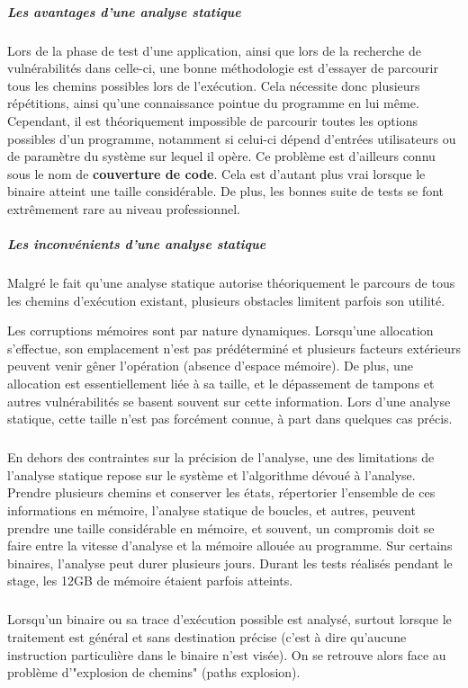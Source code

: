 \subparagraph{Les avantages d'une analyse statique}

Lors de la phase de test d'une application, ainsi que lors de la recherche de vulnérabilités dans celle-ci, une bonne méthodologie
est d'essayer de parcourir tous les chemins possibles lors de l'exécution. Cela nécessite donc plusieurs répétitions, ainsi qu'une connaissance
pointue du programme en lui même.\newline
Cependant, il est théoriquement impossible de parcourir toutes les options possibles d'un programme, notamment si
celui-ci dépend d'entrées utilisateurs ou de paramètre du système sur lequel il opère. Ce problème est d'ailleurs connu sous le nom de \textbf{couverture de code}. Cela est d'autant plus vrai lorsque le binaire atteint une taille
considérable. De plus, les bonnes suite de tests se font extrêmement rare au niveau professionnel.

\subparagraph{Les inconvénients d'une analyse statique}

Malgré le fait qu'une analyse statique autorise théoriquement le parcours de tous les chemins d'exécution existant, plusieurs obstacles
limitent parfois son utilité.\newline

Les corruptions mémoires sont par nature dynamiques. Lorsqu'une allocation s'effectue, son emplacement n'est pas prédéterminé
et plusieurs facteurs extérieurs peuvent venir gêner l'opération (absence d'espace mémoire). De plus, une allocation
est essentiellement liée à sa taille, et le dépassement de tampons et autres vulnérabilités se basent souvent sur cette information.
Lors d'une analyse statique, cette taille n'est pas forcément connue, à part dans quelques cas précis.
\subparagraph{}

En dehors des contraintes sur la précision de l'analyse, une des limitations de l'analyse statique repose sur le système et l'algorithme
dévoué à l'analyse. Prendre plusieurs chemins et conserver les états, répertorier l'ensemble de ces informations en mémoire, l'analyse
statique de boucles, et autres, peuvent prendre une taille considérable en mémoire, et souvent, un compromis doit se faire entre la vitesse
d'analyse et la mémoire allouée au programme. Sur certains binaires, l'analyse peut durer plusieurs jours. Durant les tests réalisés pendant le
stage, les 12GB de mémoire étaient parfois atteints.

\subparagraph{}
Lorsqu'un binaire ou sa trace d'exécution possible est analysé, surtout lorsque le traitement est général et sans destination précise (c'est à dire
qu'aucune instruction particulière dans le binaire n'est visée). On se retrouve alors face au problème d'"explosion de chemins" (paths explosion).

